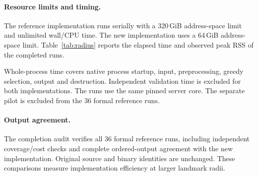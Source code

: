 \paragraph{Resource limits and timing.}
The reference implementation runs serially with a 320\,GiB address-space limit and unlimited wall/CPU time. The new implementation uses a 64\,GiB address-space limit. Table~\ref{tab:radius} reports the elapsed time and observed peak RSS of the completed runs.

Whole-process time covers native process startup, input, preprocessing, greedy selection, output and destruction. Independent validation time is excluded for both implementations. The runs use the same pinned server core. The separate pilot is excluded from the 36 formal reference runs.

\paragraph{Output agreement.}
The completion audit verifies all 36 formal reference runs, including independent coverage/cost checks and complete ordered-output agreement with the new implementation. Original source and binary identities are unchanged. These comparisons measure implementation efficiency at larger landmark radii.
